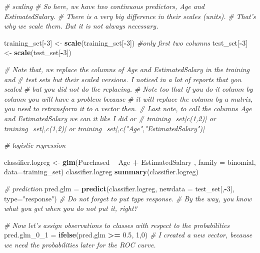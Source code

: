 \documentclass[]{book}
\newenvironment{Shaded}{\begin{snugshade}}{\end{snugshade}}
\newcommand{\KeywordTok}[1]{\textcolor[rgb]{0.13,0.29,0.53}{\textbf{#1}}}
\newcommand{\DataTypeTok}[1]{\textcolor[rgb]{0.13,0.29,0.53}{#1}}
\newcommand{\DecValTok}[1]{\textcolor[rgb]{0.00,0.00,0.81}{#1}}
\newcommand{\FloatTok}[1]{\textcolor[rgb]{0.00,0.00,0.81}{#1}}
\newcommand{\StringTok}[1]{\textcolor[rgb]{0.31,0.60,0.02}{#1}}
\newcommand{\CommentTok}[1]{\textcolor[rgb]{0.56,0.35,0.01}{\textit{#1}}}
\newcommand{\OperatorTok}[1]{\textcolor[rgb]{0.81,0.36,0.00}{\textbf{#1}}}
\newcommand{\NormalTok}[1]{#1}
\theoremstyle{definition}
\theoremstyle{definition}
\theoremstyle{definition}
\theoremstyle{remark}
\begin{document}
\begin{Shaded}
\begin{Highlighting}[]
\CommentTok{# scaling}
\CommentTok{# So here, we have two continuous predictors, Age and EstimatedSalary.}
\CommentTok{# There is a very big difference in their scales (units).}
\CommentTok{# That's why we scale them. But it is not always necessary.}

\NormalTok{training_set[}\OperatorTok{-}\DecValTok{3}\NormalTok{] <-}\StringTok{ }\KeywordTok{scale}\NormalTok{(training_set[}\OperatorTok{-}\DecValTok{3}\NormalTok{]) }\CommentTok{#only first two columns}
\NormalTok{test_set[}\OperatorTok{-}\DecValTok{3}\NormalTok{] <-}\StringTok{ }\KeywordTok{scale}\NormalTok{(test_set[}\OperatorTok{-}\DecValTok{3}\NormalTok{])}

\CommentTok{# Note that, we replace the columns of Age and EstimatedSalary in the training and}
\CommentTok{# test sets but their scaled versions. I noticed in a lot of reports that you scaled}
\CommentTok{# but you did not do the replacing.}
\CommentTok{# Note too that if you do it column by column you will have a problem because }
\CommentTok{# it will replace the column by a matrix, you need to retransform it to a vector then.}
\CommentTok{# Last note, to call the columns Age and EstimatedSalary we can it like I did or }
\CommentTok{# training_set[c(1,2)] or training_set[,c(1,2)] or training_set[,c("Age","EstimatedSalary")]}



\CommentTok{# logistic regression}

\NormalTok{classifier.logreg <-}\StringTok{ }\KeywordTok{glm}\NormalTok{(Purchased }\OperatorTok{~}\StringTok{ }\NormalTok{Age }\OperatorTok{+}\StringTok{ }\NormalTok{EstimatedSalary , }\DataTypeTok{family =}\NormalTok{ binomial, }\DataTypeTok{data=}\NormalTok{training_set)}
\NormalTok{classifier.logreg}
\KeywordTok{summary}\NormalTok{(classifier.logreg)}

\CommentTok{# prediction}
\NormalTok{pred.glm =}\StringTok{ }\KeywordTok{predict}\NormalTok{(classifier.logreg, }\DataTypeTok{newdata =}\NormalTok{ test_set[,}\OperatorTok{-}\DecValTok{3}\NormalTok{], }\DataTypeTok{type=}\StringTok{"response"}\NormalTok{)}
\CommentTok{# Do not forget to put type response. }
\CommentTok{# By the way, you know what you get when you do not put it, right?}

\CommentTok{# Now let's assign observations to classes with respect to the probabilities}
\NormalTok{pred.glm_0_}\DecValTok{1}\NormalTok{ =}\StringTok{ }\KeywordTok{ifelse}\NormalTok{(pred.glm }\OperatorTok{>=}\StringTok{ }\FloatTok{0.5}\NormalTok{, }\DecValTok{1}\NormalTok{,}\DecValTok{0}\NormalTok{)}
\CommentTok{# I created a new vector, because we need the probabilities later for the ROC curve.}


\end{Highlighting}
\end{Shaded}
\end{document}
